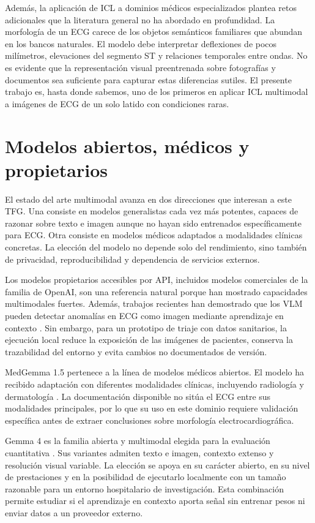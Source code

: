 Además, la aplicación de ICL a dominios médicos especializados plantea retos adicionales que la literatura general no ha abordado en profundidad. La morfología de un ECG carece de los objetos semánticos familiares que abundan en los bancos naturales. El modelo debe interpretar deflexiones de pocos milímetros, elevaciones del segmento ST y relaciones temporales entre ondas. No es evidente que la representación visual preentrenada sobre fotografías y documentos sea suficiente para capturar estas diferencias sutiles. El presente trabajo es, hasta donde sabemos, uno de los primeros en aplicar ICL multimodal a imágenes de ECG de un solo latido con condiciones raras.

\section{Modelos abiertos, médicos y propietarios}

El estado del arte multimodal avanza en dos direcciones que interesan a este TFG. Una consiste en modelos generalistas cada vez más potentes, capaces de razonar sobre texto e imagen aunque no hayan sido entrenados específicamente para ECG. Otra consiste en modelos médicos adaptados a modalidades clínicas concretas. La elección del modelo no depende solo del rendimiento, sino también de privacidad, reproducibilidad y dependencia de servicios externos.

Los modelos propietarios accesibles por API, incluidos modelos comerciales de la familia de OpenAI, son una referencia natural porque han mostrado capacidades multimodales fuertes. Además, trabajos recientes han demostrado que los VLM pueden detectar anomalías en ECG como imagen mediante aprendizaje en contexto \cite{camba2026icl}. Sin embargo, para un prototipo de triaje con datos sanitarios, la ejecución local reduce la exposición de las imágenes de pacientes, conserva la trazabilidad del entorno y evita cambios no documentados de versión.

MedGemma 1.5 pertenece a la línea de modelos médicos abiertos. El modelo ha recibido adaptación con diferentes modalidades clínicas, incluyendo radiología y dermatología \cite{medgemma15}. La documentación disponible no sitúa el ECG entre sus modalidades principales, por lo que su uso en este dominio requiere validación específica antes de extraer conclusiones sobre morfología electrocardiográfica.

Gemma 4 es la familia abierta y multimodal elegida para la evaluación cuantitativa \cite{gemma4card}. Sus variantes admiten texto e imagen, contexto extenso y resolución visual variable. La elección se apoya en su carácter abierto, en su nivel de prestaciones y en la posibilidad de ejecutarlo localmente con un tamaño razonable para un entorno hospitalario de investigación. Esta combinación permite estudiar si el aprendizaje en contexto aporta señal sin entrenar pesos ni enviar datos a un proveedor externo.

